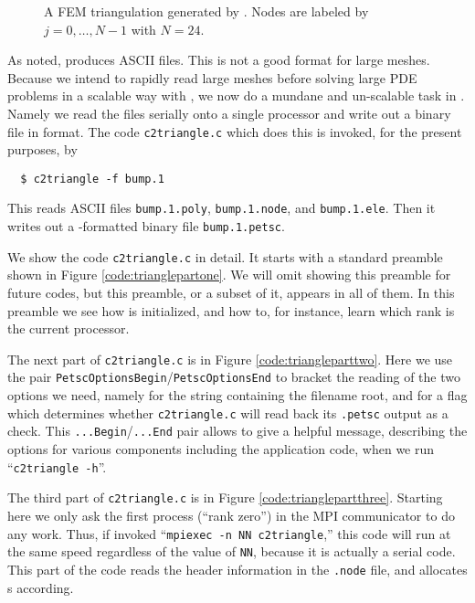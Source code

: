 \begin{figure*}

\caption{A FEM triangulation generated by \Triangle.  Nodes are labeled by $j=0,\dots,N-1$ with $N=24$.}
\label{fig:triangulation}
\end{figure*}

As noted, \Triangle produces ASCII files.  This is not a good format for large meshes.  Because we intend to rapidly read large meshes before solving large PDE problems in a scalable way with \PETSc, we now do a mundane and un-scalable task in \PETSc.  Namely we read the \Triangle files serially onto a single processor and write out a binary file in \PETSc format.  The code \texttt{c2triangle.c} which does this is invoked, for the present purposes, by
\begin{verbatim}
  $ c2triangle -f bump.1
\end{verbatim}
This reads ASCII files \texttt{bump.1.poly}, \texttt{bump.1.node}, and \texttt{bump.1.ele}.  Then it writes out a \PETSc-formatted binary file \texttt{bump.1.petsc}.

We show the code \texttt{c2triangle.c} in detail.  It starts with a standard preamble shown in Figure  \ref{code:trianglepartone}.  We will omit showing this preamble for future codes, but this preamble, or a subset of it, appears in all of them. In this preamble we see how \PETSc is initialized, and how to, for instance, learn which rank is the current processor.


The next part of \texttt{c2triangle.c} is in Figure \ref{code:triangleparttwo}.  Here we use the pair \texttt{PetscOptionsBegin}/\texttt{PetscOptionsEnd} to bracket the reading of the two options we need, namely for the string containing the filename root, and for a flag which determines whether \texttt{c2triangle.c} will read back its \texttt{.petsc} output as a check.  This \texttt{...Begin}/\texttt{...End} pair allows \PETSc to give a helpful message, describing the options for various components including the application code, when we run ``\texttt{c2triangle -h}''.


The third part of \texttt{c2triangle.c} is in Figure \ref{code:trianglepartthree}.  Starting here we only ask the first process (``rank zero'') in the MPI communicator to do any work.  Thus, if invoked ``\texttt{mpiexec -n NN c2triangle},'' this code will run at the same speed regardless of the value of \texttt{NN}, because it is actually a serial code.  This part of the code reads the header information in the \texttt{.node} file, and allocates \PETSc \pVec s according.

